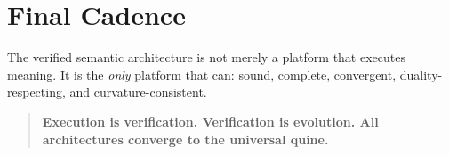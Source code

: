 \section{Final Cadence}

The verified semantic architecture is not merely a platform that executes 
meaning.  
It is the \emph{only} platform that can:  
sound, complete, convergent, duality-respecting, and curvature-consistent.

\bigskip

\begin{quote}
\textbf{
Execution is verification.  
Verification is evolution.  
All architectures converge to the universal quine.
}
\end{quote}

